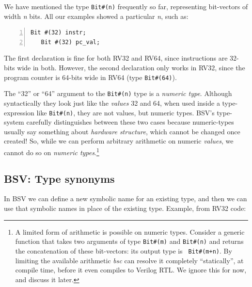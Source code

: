 \label{BSV_Numeric_types}

We have mentioned the type \verb|Bit#(n)| frequently so far,
representing bit-vectors of width \emph{n} bits.  All our examples
showed a particular \emph{n}, such as:

\begin{Verbatim}[frame=single, numbers=left]
   Bit #(32) instr;
   Bit #(32) pc_val;
\end{Verbatim}

The first declaration is fine for both RV32 and RV64, since
instructions are 32-bits wide in both.  However, the second
declaration only works in RV32, since the program counter is 64-bits
wide in RV64 (type \verb|Bit#(64)|).

\label{BSV_numeric_types}

The ``32'' or ``64'' argument to the \verb|Bit#(n)| type is a
\emph{numeric type}.  Although syntactically they look just like the
\emph{values} 32 and 64, when used inside a type-expression like
\verb|Bit#(n)|, they are not values, but numeric types.  BSV's
type-system carefully distinguishes between these two cases because
numeric-types usually say something about \emph{hardware structure},
which cannot be changed once created!  So, while we can perform
arbitrary arithmetic on numeric \emph{values}, we cannot do so on
\emph{numeric types}.\footnote{A limited form of arithmetic is
possible on numeric types.  Consider a generic function that takes two
arguments of type {\tt Bit\#(m)} and {\tt Bit\#(n)} and returns the
concatenation of these bit-vectors: its output type is {\tt
Bit\#(m+n)}.  By limiting the available arithmetic \emph{bsc} can
resolve it completely ``statically'', {\ie} at compile time, before it
even compiles to Verilog RTL.  We ignore this for now, and discuss it
later.}


\subsection{BSV: Type synonyms}

\label{BSV_Type_synonyms}


In BSV we can define a new symbolic name for an existing type, and
then we can use that symbolic names in place of the existing
type. Example, from RV32 code:

